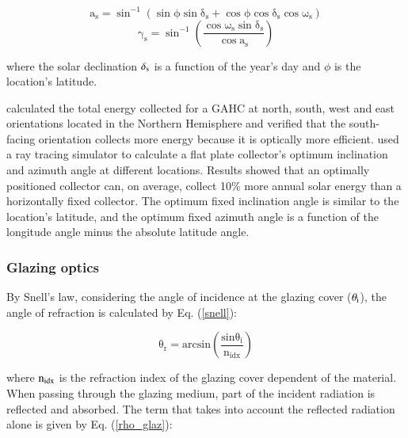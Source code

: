 \begin{equation}
	\mathrm{{a_s} = {\sin ^{ - 1}}\left( {\sin \phi \sin {\delta _s} + \cos \phi \cos {\delta _s}\cos {\omega_s}} \right)}
	\label{solar_alt0}
\end{equation}
\vspace*{-0.5cm}
\begin{equation}
	\mathrm{\gamma_s = {\sin^{-1}}\left(\frac{\cos \omega_s \sin \delta_s}{\cos a_s}\right)}
	\label{azimuth0}
\end{equation}

\noindent where the solar declination $\delta_{\rm{s}}$ is a function of the year's day and $\phi$ is the location's latitude.

\citet{Pottler1999} calculated the total energy collected for a GAHC at north, south, west and east orientations located in the Northern Hemisphere and verified that the south-facing orientation collects more energy because it is optically more efficient. \citet{Roux2016} used a ray tracing simulator to calculate a flat plate collector's optimum inclination and azimuth angle at different locations. Results showed that an optimally positioned collector can, on average, collect 10\% more annual solar energy than a horizontally fixed collector. The optimum fixed inclination angle is similar to the location's latitude, and the optimum fixed azimuth angle is a function of the longitude angle minus the absolute latitude angle.

\subsubsection{Glazing optics}

By Snell's law, considering the angle of incidence at the glazing cover ($\theta_{\rm{i}}$), the angle of refraction is calculated by Eq. (\ref{snell}):

\begin{equation}
	\mathrm{\theta_r = arcsin\left(\frac{sin\theta_{i}}{n_{idx}} \right)  }
	\label{snell}
\end{equation}

\noindent where $\rm{n_{idx}}$ is the refraction index of the glazing cover dependent of the material. When passing through the glazing medium, part of the incident radiation is reflected and absorbed. The term that takes into account the reflected radiation alone is given by Eq. (\ref{rho_glaz}):

%

